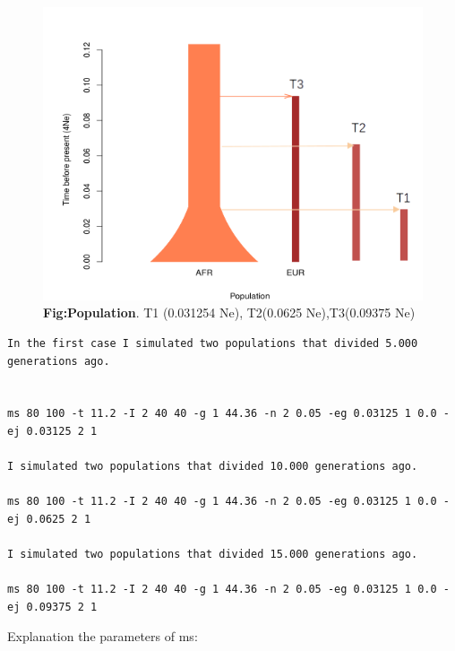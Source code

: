\begin{figure}[H]
\centering
\includegraphics[width=1.10\textwidth]{fig/populationthreetime.png}
\decoRule
\caption{\textbf{Fig:Population}. 
T1 (0.031254 Ne), T2(0.0625 Ne),T3(0.09375 Ne)}
\label{fig:population.pdf}
\end{figure}

\begin{verbatim}
In the first case I simulated two populations that divided 5.000 generations ago.


ms 80 100 -t 11.2 -I 2 40 40 -g 1 44.36 -n 2 0.05 -eg 0.03125 1 0.0 -ej 0.03125 2 1   

I simulated two populations that divided 10.000 generations ago.

ms 80 100 -t 11.2 -I 2 40 40 -g 1 44.36 -n 2 0.05 -eg 0.03125 1 0.0 -ej 0.0625 2 1   

I simulated two populations that divided 15.000 generations ago.

ms 80 100 -t 11.2 -I 2 40 40 -g 1 44.36 -n 2 0.05 -eg 0.03125 1 0.0 -ej 0.09375 2 1   
\end{verbatim}

Explanation the parameters of ms:

